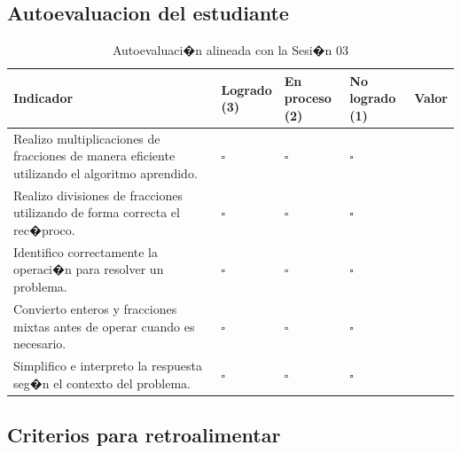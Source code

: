 \documentclass[
	spanish,
	letterpaper, oneside
]{article}
\begin{document}
\subsection{Autoevaluacion del estudiante}

\begin{table}[H]
\centering
\caption{Autoevaluaci�n alineada con la Sesi�n 03}
\label{tab:autoevaluacion-sesion03}

\small
\renewcommand{\arraystretch}{1.45}
\setlength{\tabcolsep}{5pt}

\begin{tabularx}{\textwidth}{@{}
>{\raggedright\arraybackslash}X
>{\centering\arraybackslash}p{}
>{\centering\arraybackslash}p{}
>{\centering\arraybackslash}p{}
>{\centering\arraybackslash}p{}
@{}}
\toprule
\textbf{Indicador} &
\makecell{\textbf{Logrado}\\\textbf{(3)}} &
\makecell{\textbf{En proceso}\\\textbf{(2)}} &
\makecell{\textbf{No logrado}\\\textbf{(1)}} &
\textbf{Valor} \\
\midrule

Realizo multiplicaciones de fracciones de manera eficiente utilizando el algoritmo aprendido. 
& $\square$ & $\square$ & $\square$ & \\

Realizo divisiones de fracciones utilizando de forma correcta el rec�proco. 
& $\square$ & $\square$ & $\square$ & \\

Identifico correctamente la operaci�n para resolver un problema. 
& $\square$ & $\square$ & $\square$ & \\

Convierto enteros y fracciones mixtas antes de operar cuando es necesario. 
& $\square$ & $\square$ & $\square$ & \\

Simplifico e interpreto la respuesta seg�n el contexto del problema. 
& $\square$ & $\square$ & $\square$ & \\

\bottomrule
\end{tabularx}

\end{table}

\subsection{Criterios para retroalimentar}
\end{document}
